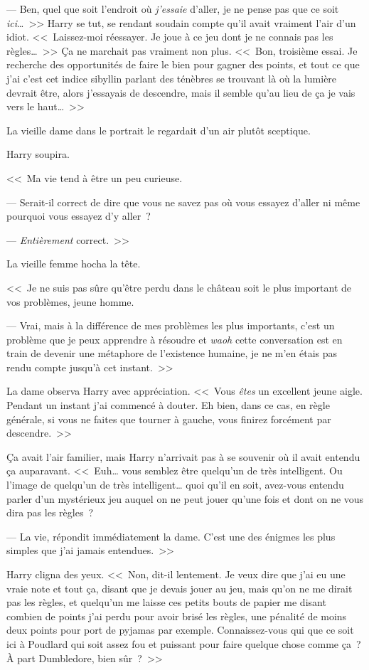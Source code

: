 --- Ben, quel que soit l'endroit où \emph{j'essaie} d'aller, je ne pense pas que ce soit \emph{ici}…~>> Harry se tut, se rendant soudain compte qu'il avait vraiment l'air d'un idiot. <<~Laissez-moi réessayer. Je joue à ce jeu dont je ne connais pas les règles…~>> Ça ne marchait pas vraiment non plus. <<~Bon, troisième essai. Je recherche des opportunités de faire le bien pour gagner des points, et tout ce que j'ai c'est cet indice sibyllin parlant des ténèbres se trouvant là où la lumière devrait être, alors j'essayais de descendre, mais il semble qu'au lieu de ça je vais vers le haut…~>>

La vieille dame dans le portrait le regardait d'un air plutôt sceptique.

Harry soupira.

<<~Ma vie tend à être un peu curieuse.

--- Serait-il correct de dire que vous ne savez pas où vous essayez d'aller ni même pourquoi vous essayez d'y aller~?

--- \emph{Entièrement} correct.~>>

La vieille femme hocha la tête.

<<~Je ne suis pas sûre qu'être perdu dans le château soit le plus important de vos problèmes, jeune homme.

--- Vrai, mais à la différence de mes problèmes les plus importants, c'est un problème que je peux apprendre à résoudre et \emph{waoh} cette conversation est en train de devenir une métaphore de l'existence humaine, je ne m'en étais pas rendu compte jusqu'à cet instant.~>>

La dame observa Harry avec appréciation. <<~Vous \emph{êtes} un excellent jeune aigle. Pendant un instant j'ai commencé à douter. Eh bien, dans ce cas, en règle générale, si vous ne faites que tourner à gauche, vous finirez forcément par descendre.~>>

Ça avait l'air familier, mais Harry n'arrivait pas à se souvenir où il avait entendu ça auparavant. <<~Euh… vous semblez être quelqu'un de très intelligent. Ou l'image de quelqu'un de très intelligent… quoi qu'il en soit, avez-vous entendu parler d'un mystérieux jeu auquel on ne peut jouer qu'une fois et dont on ne vous dira pas les règles~?

--- La vie, répondit immédiatement la dame. C'est une des énigmes les plus simples que j'ai jamais entendues.~>>

Harry cligna des yeux. <<~Non, dit-il lentement. Je veux dire que j'ai eu une vraie note et tout ça, disant que je devais jouer au jeu, mais qu'on ne me dirait pas les règles, et quelqu'un me laisse ces petits bouts de papier me disant combien de points j'ai perdu pour avoir brisé les règles, une pénalité de moins deux points pour port de pyjamas par exemple. Connaissez-vous qui que ce soit ici à Poudlard qui soit assez fou et puissant pour faire quelque chose comme ça~? À part Dumbledore, bien sûr~?~>>

